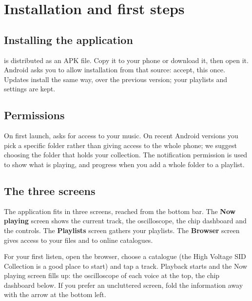 \chapter{Installation and first steps}

\section{Installing the application}
\soft is distributed as an APK file. Copy it to your phone or download it, then open it. Android asks you to allow
installation from that source: accept, this once. Updates install the same way, over the previous version; your
playlists and settings are kept.

\section{Permissions}
On first launch, \soft asks for access to your music. On recent Android versions you pick a specific folder rather
than giving access to the whole phone; we suggest choosing the folder that holds your collection. The notification
permission is used to show what is playing, and progress when you add a whole folder to a playlist.

\section{The three screens}
The application fits in three screens, reached from the bottom bar. The \textbf{Now playing} screen shows the
current track, the oscilloscope, the chip dashboard and the controls. The \textbf{Playlists} screen gathers your
playlists. The \textbf{Browser} screen gives access to your files and to online catalogues.


For your first listen, open the browser, choose a catalogue (the High Voltage SID Collection is a good place to
start) and tap a track. Playback starts and the Now playing screen fills up: the oscilloscope of each voice at the
top, the chip dashboard below. If you prefer an uncluttered screen, fold the information away with the arrow at the
bottom left.

